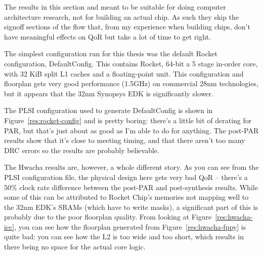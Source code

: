 \documentclass{article}
\begin{document}
The results in this section and meant to be suitable for doing computer
architecture research, not for building an actual chip.  As such they skip the
signoff sections of the flow that, from my experience when building chips,
don't have meaningful effects on QoR but take a lot of time to get right.

The simplest configuration run for this thesis was the default Rocket
configuration, DefaultConfig.  This contains Rocket, 64-bit a 5 stage in-order
core, with 32 KiB split L1 caches and a floating-point unit.  This
configuration and floorplan gets very good performance (1.5GHz) on commercial
28nm technologies, but it appears that the 32nm Synopsys EDK is significantly
slower.

The PLSI configuration used to generate DefaultConfig is shown in
Figure~\ref{res:rocket-config} and is pretty boring: there's a little bit of
derating for PAR, but that's just about as good as I'm able to do for anything.
The post-PAR results show that it's close to meeting timing, and that there
aren't too many DRC errors so the results are probably believable.

The Hwacha results are, however, a whole different story.  As you can see from
the PLSI configuration file, the physical design here gets very bad QoR --
there's a 50\% clock rate difference between the post-PAR and post-synthesis
results.  While some of this can be attributed to Rocket Chip's memories not
mapping well to the 32nm EDK's SRAMs (which have to write masks), a significant
part of this is probably due to the poor floorplan quality.  From looking at
Figure~\ref{res:hwacha-icc}, you can see how the floorplan generated from
Figure~\ref{res:hwacha-fppy} is quite bad: you can see how the L2 is too wide
and too short, which results in there being no space for the actual core logic.
\end{document}
